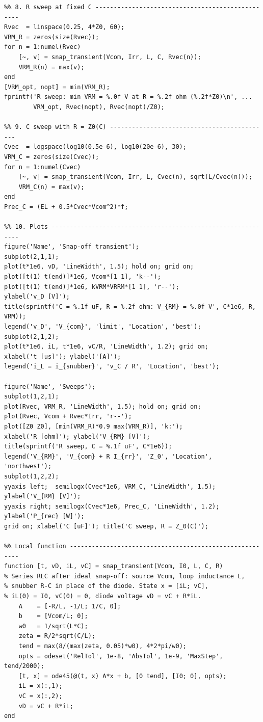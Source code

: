 \documentclass[11pt,a4paper]{article}
\begin{document}
\begin{lstlisting}
%% 8. R sweep at fixed C -------------------------------------------------
Rvec  = linspace(0.25, 4*Z0, 60);
VRM_R = zeros(size(Rvec));
for n = 1:numel(Rvec)
    [~, v] = snap_transient(Vcom, Irr, L, C, Rvec(n));
    VRM_R(n) = max(v);
end
[VRM_opt, nopt] = min(VRM_R);
fprintf('R sweep: min VRM = %.0f V at R = %.2f ohm (%.2f*Z0)\n', ...
        VRM_opt, Rvec(nopt), Rvec(nopt)/Z0);

%% 9. C sweep with R = Z0(C) --------------------------------------------
Cvec  = logspace(log10(0.5e-6), log10(20e-6), 30);
VRM_C = zeros(size(Cvec));
for n = 1:numel(Cvec)
    [~, v] = snap_transient(Vcom, Irr, L, Cvec(n), sqrt(L/Cvec(n)));
    VRM_C(n) = max(v);
end
Prec_C = (EL + 0.5*Cvec*Vcom^2)*f;

%% 10. Plots -------------------------------------------------------------
figure('Name', 'Snap-off transient');
subplot(2,1,1);
plot(t*1e6, vD, 'LineWidth', 1.5); hold on; grid on;
plot([t(1) t(end)]*1e6, Vcom*[1 1], 'k--');
plot([t(1) t(end)]*1e6, kVRM*VRRM*[1 1], 'r--');
ylabel('v_D [V]');
title(sprintf('C = %.1f uF, R = %.2f ohm: V_{RM} = %.0f V', C*1e6, R, VRM));
legend('v_D', 'V_{com}', 'limit', 'Location', 'best');
subplot(2,1,2);
plot(t*1e6, iL, t*1e6, vC/R, 'LineWidth', 1.2); grid on;
xlabel('t [us]'); ylabel('[A]');
legend('i_L = i_{snubber}', 'v_C / R', 'Location', 'best');

figure('Name', 'Sweeps');
subplot(1,2,1);
plot(Rvec, VRM_R, 'LineWidth', 1.5); hold on; grid on;
plot(Rvec, Vcom + Rvec*Irr, 'r--');
plot([Z0 Z0], [min(VRM_R)*0.9 max(VRM_R)], 'k:');
xlabel('R [ohm]'); ylabel('V_{RM} [V]');
title(sprintf('R sweep, C = %.1f uF', C*1e6));
legend('V_{RM}', 'V_{com} + R I_{rr}', 'Z_0', 'Location', 'northwest');
subplot(1,2,2);
yyaxis left;  semilogx(Cvec*1e6, VRM_C, 'LineWidth', 1.5); ylabel('V_{RM} [V]');
yyaxis right; semilogx(Cvec*1e6, Prec_C, 'LineWidth', 1.2); ylabel('P_{rec} [W]');
grid on; xlabel('C [uF]'); title('C sweep, R = Z_0(C)');

%% Local function --------------------------------------------------------
function [t, vD, iL, vC] = snap_transient(Vcom, I0, L, C, R)
% Series RLC after ideal snap-off: source Vcom, loop inductance L,
% snubber R-C in place of the diode. State x = [iL; vC],
% iL(0) = I0, vC(0) = 0, diode voltage vD = vC + R*iL.
    A    = [-R/L, -1/L; 1/C, 0];
    b    = [Vcom/L; 0];
    w0   = 1/sqrt(L*C);
    zeta = R/2*sqrt(C/L);
    tend = max(8/(max(zeta, 0.05)*w0), 4*2*pi/w0);
    opts = odeset('RelTol', 1e-8, 'AbsTol', 1e-9, 'MaxStep', tend/2000);
    [t, x] = ode45(@(t, x) A*x + b, [0 tend], [I0; 0], opts);
    iL = x(:,1);
    vC = x(:,2);
    vD = vC + R*iL;
end
\end{lstlisting}
\end{document}
